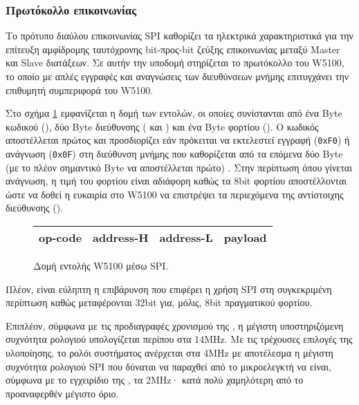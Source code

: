 \subsubsection{Πρωτόκολλο επικοινωνίας}

Το πρότυπο διαύλου επικοινωνίας SPI καθορίζει τα ηλεκτρικά χαρακτηριστικά για
την επίτευξη αμφίδρομης ταυτόχρονης bit-προς-bit ζεύξης επικοινωνίας μεταξύ
Master και Slave διατάξεων.
Σε αυτήν την υποδομή στηρίζεται το πρωτόκολλο του W5100, το οποίο με απλές
εγγραφές και αναγνώσεις των διευθύνσεων μνήμης επιτυγχάνει την επιθυμητή
συμπεριφορά του W5100.

Στο σχήμα \ref{fig:network:w5100-command-format} εμφανίζεται η δομή των εντολών,
οι οποίες συνίστανται από ένα Byte κωδικού (), δύο Byte διεύθυνσης
( και ) και ένα Byte φορτίου (). Ο
κωδικός αποστέλλεται πρώτος και προσδιορίζει εάν πρόκειται να εκτελεστεί εγγραφή
(\verb~0xF0~) ή ανάγνωση (\verb~0x0F~) στη διεύθυνση μνήμης που καθορίζεται από
τα επόμενα δύο Byte (με το πλέον σημαντικό Byte να αποστέλλεται πρώτο)
\parencite[61]{wiz11:w5100}.
Στην περίπτωση όπου γίνεται ανάγνωση, η τιμή του φορτίου είναι αδιάφορη καθώς τα
8bit φορτίου αποστέλλονται ώστε να δοθεί η ευκαιρία στο W5100 να επιστρέψει τα
περιεχόμενα της αντίστοιχης διεύθυνσης ().

\begin{figure}
    \caption{Δομή εντολής W5100 μέσω SPI.
    \label{fig:network:w5100-command-format}}
    \begin{center}\begin{tabu} spread 0pt {|*4{X[1,c]|}}

    \hline
    op-code & address-H & address-L & payload \\
    \hline

    \end{tabu}\end{center}
\end{figure}

Πλέον, είναι εύληπτη η επιβάρυνση που επιφέρει η χρήση SPI στη συγκεκριμένη
περίπτωση καθώς μεταφέρονται 32bit για, μόλις, 8bit πραγματικού φορτίου.

Επιπλέον, σύμφωνα με τις προδιαγραφές χρονισμού της \textcite[66]{wiz11:w5100},
η μέγιστη υποστηριζόμενη συχνότητα ρολογιού υπολογίζεται περίπου στα 14MHz. Με
τις τρέχουσες επιλογές της υλοποίησης, το ρολόι συστήματος ανέρχεται στα 4MHz
με αποτέλεσμα η μέγιστη συχνότητα ρολογιού SPI που δύναται να παραχθεί από το
μικροελεγκτή να είναι, σύμφωνα με το εγχειρίδιο της
\textcite[179--180]{atmel13}, τα 2MHz· κατά πολύ χαμηλότερη από το προαναφερθέν
μέγιστο όριο.


